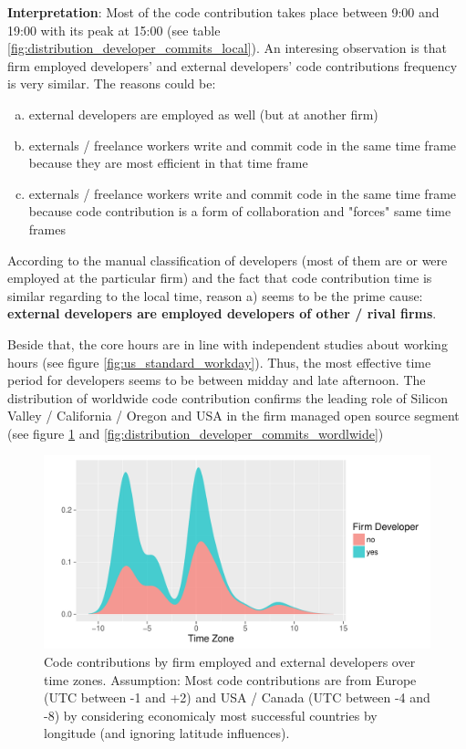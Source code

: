 \textbf{Interpretation}: Most of the code contribution takes place between 9:00 and 19:00 with its peak at 15:00 (see table \ref{fig:distribution_developer_commits_local}). An interesing observation is that firm employed developers' and external developers' code contributions frequency is very similar. The reasons could be:

\begin{enumerate}[a)]
	\item external developers are employed as well (but at another firm)
	\item externals / freelance workers write and commit code in the same time frame because they are most efficient in that time frame
	\item externals / freelance workers write and commit code in the same time frame because code contribution is a form of collaboration and "forces" same time frames
\end{enumerate}

According to the manual classification of developers (most of them are or were employed at the particular firm) and the fact that code contribution time is similar regarding to the local time, reason a) seems to be the prime cause: \textbf{external developers are employed developers of other / rival firms}.

Beside that, the core hours are in line with independent studies about working hours (see figure \ref{fig:us_standard_workday}). Thus, the most effective time period for developers seems to be between midday and late afternoon. The distribution of worldwide code contribution confirms the leading role of Silicon Valley / California / Oregon and USA in the firm managed open source segment (see figure \ref{fig:distribution_developer_commits_by_timezone} and  \ref{fig:distribution_developer_commits_wordlwide})

\begin{figure}[!ht]
	\centering
	\includegraphics[page=1,scale=0.7]{../graphics/intro/timezone_of_code_contribution.pdf}
	\caption{Code contributions by firm employed and external developers over time zones. Assumption: Most code contributions are from Europe (UTC between -1 and +2) and USA / Canada (UTC between -4 and -8) by considering economicaly most successful countries by longitude (and ignoring latitude influences).}
	\label{fig:distribution_developer_commits_by_timezone}
\end{figure}

